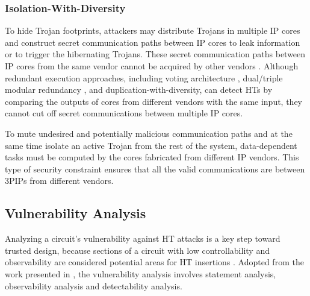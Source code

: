 \documentclass[10pt,journal, compsoc]{IEEEtran}
\begin{document}
\subsubsection{Isolation-With-Diversity}

To hide Trojan footprints, attackers may distribute Trojans in multiple IP cores and construct secret communication paths between IP cores to leak information or to trigger the hibernating Trojans. These secret communication paths between IP cores from the same vendor cannot be acquired by other vendors \cite{article:JR3}. Although redundant execution approaches, including voting architecture \cite{conference:MB}, dual/triple modular redundancy \cite{conference:DG}, and duplication-with-diversity, can detect HTs by comparing the outputs of cores from different vendors with the same input, they cannot cut off secret communications between multiple IP cores.


To mute undesired and potentially malicious communication paths and at the same time isolate an active Trojan from the rest of the system, data-dependent tasks must be computed by the cores fabricated from different IP vendors. This type of security constraint ensures that all the valid communications are between 3PIPs from different vendors.







\subsection{Vulnerability Analysis}



Analyzing a circuit's vulnerability against HT attacks is a key step toward trusted design, because sections of a circuit with low controllability and observability are considered potential areas for HT insertions \cite{article:JC,article:YD}. Adopted from the work presented in \cite{conference:HS}, the vulnerability analysis involves statement analysis, observability analysis and detectability analysis.

\end{document}
